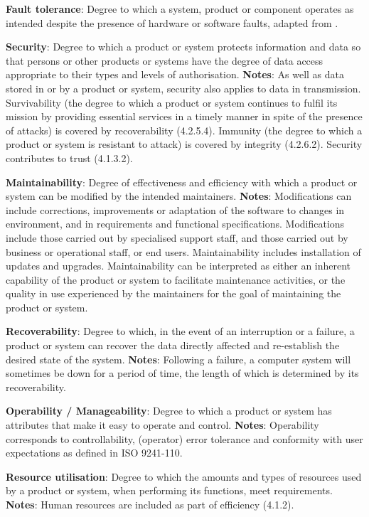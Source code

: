 \textbf{Fault tolerance}: Degree to which a system, product or component operates as intended despite the presence of hardware or software faults, adapted from \cite{iso_central_secretary_isoiecieee_2010}.

\textbf{Security}: Degree to which a product or system protects information and data so that persons or other products or systems have the degree of data access appropriate to their types and levels of authorisation. \textbf{Notes}: As well as data stored in or by a product or system, security also applies to data in transmission. Survivability (the degree to which a product or system continues to fulfil its mission by providing essential services in a timely manner in spite of the presence of attacks) is covered by recoverability (4.2.5.4). Immunity (the degree to which a product or system is resistant to attack) is covered by integrity (4.2.6.2). Security contributes to trust (4.1.3.2).

\textbf{Maintainability}: Degree of effectiveness and efficiency with which a product or system can be modified by the intended maintainers. \textbf{Notes}: Modifications can include corrections, improvements or adaptation of the software to changes in environment, and in requirements and functional specifications. Modifications include those carried out by specialised support staff, and those carried out by business or operational staff, or end users. Maintainability includes installation of updates and upgrades. Maintainability can be interpreted as either an inherent capability of the product or system to facilitate maintenance activities, or the quality in use experienced by the maintainers for the goal of maintaining the product or system.

\textbf{Recoverability}: Degree to which, in the event of an interruption or a failure, a product or system can recover the data directly affected and re-establish the desired state of the system. \textbf{Notes}: Following a failure, a computer system will sometimes be down for a period of time, the length of which is determined by its recoverability.

\textbf{Operability / Manageability}: Degree to which a product or system has attributes that make it easy to operate and control. \textbf{Notes}: Operability corresponds to controllability, (operator) error tolerance and conformity with user expectations as defined in ISO 9241-110.

\textbf{Resource utilisation}: Degree to which the amounts and types of resources used by a product or system, when performing its functions, meet requirements. \textbf{Notes}: Human resources are included as part of efficiency (4.1.2).

